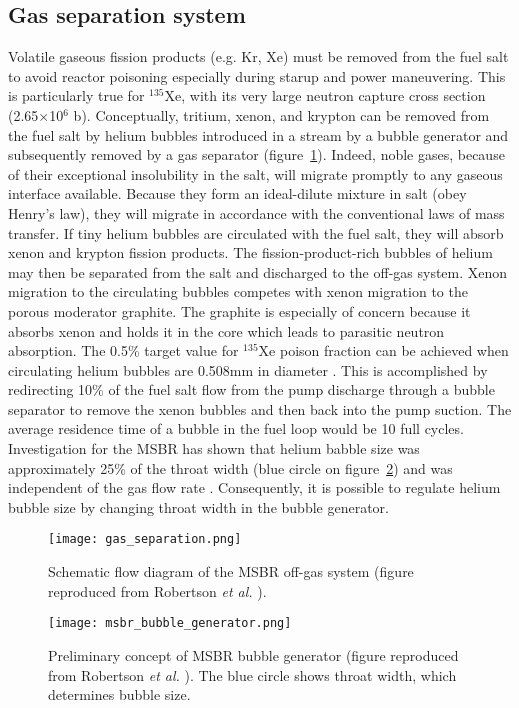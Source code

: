 \subsection{Gas separation system}
Volatile gaseous fission products (e.g. Kr, Xe) must be removed from the fuel salt 
to avoid reactor poisoning especially during starup and power maneuvering. This is 
particularly true for $^{135}$Xe, with its very large neutron capture cross 
section (2.65$\times$10$^6$ b). Conceptually, tritium, xenon, and krypton 
can be removed from the fuel salt by helium bubbles introduced in a stream 
by a bubble generator and subsequently removed 
by a gas separator (figure~\ref{fig:gas_removal_system}). Indeed, noble gases, because of their exceptional insolubility 
in the salt, will migrate promptly to any gaseous interface available. Because 
they form an ideal-dilute mixture in salt (obey Henry's law), they will migrate in 
accordance with the conventional laws of mass transfer. If tiny helium bubbles 
are circulated with the fuel salt, they will absorb xenon and krypton fission 
products. The fission-product-rich bubbles of helium may then be separated from 
the salt and discharged to the off-gas system. Xenon migration to the circulating 
bubbles competes with xenon migration to the porous moderator graphite. 
The graphite is especially of concern because it absorbs xenon and holds it in the 
core which leads to parasitic neutron absorption. The 0.5\% target value for 
$^{135}$Xe poison fraction can be achieved when circulating helium bubbles are 
0.508mm in diameter \cite{robertson_conceptual_1971}. This is accomplished by 
redirecting 10\% of the fuel salt flow from the pump discharge 
through a bubble separator 
to remove the xenon bubbles and then back into the pump suction. The average 
residence time of a bubble in the fuel loop would be 10 full cycles. Investigation 
for the \gls{MSBR} has shown that helium babble size was approximately 25\% of the 
throat width (blue circle on figure~\ref{fig:bubble_separator}) and was independent 
of the gas flow rate \cite{robertson_conceptual_1971}. Consequently, it is possible 
to regulate helium bubble size by changing throat width in the bubble generator.
\begin{figure}[htp!] %
  \centering
  \texttt{[image: gas\_separation.png]}
  \caption{Schematic flow diagram of the \gls{MSBR} off-gas system (figure 
  reproduced from Robertson \emph{et al.} \cite{robertson_conceptual_1971}).}
  \label{fig:gas_removal_system}
\end{figure}
\begin{figure}[htp!] %
  \centering
  \texttt{[image: msbr\_bubble\_generator.png]}
  \caption{Preliminary concept of \gls{MSBR} bubble generator (figure 
  reproduced from Robertson \emph{et al.} \cite{robertson_conceptual_1971}). 
  The blue circle shows 
  throat width, which determines bubble size.}
  \label{fig:bubble_separator}
\end{figure}

